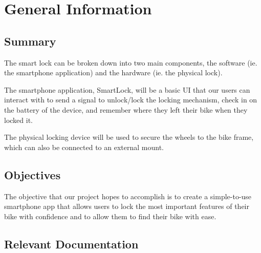 \documentclass[12pt, titlepage]{article}
\begin{document}
\section{General Information}

\subsection{Summary}

The smart lock can be broken down into two main components, the software (ie. the smartphone application) and the hardware (ie. the physical lock).

The smartphone application, SmartLock, will be a basic UI that our users can interact with to send a signal to unlock/lock the locking mechanism, check in on the battery of the device, and remember where they left their bike when they locked it.

The physical locking device will be used to secure the wheels to the bike frame, which can also be connected to an external mount.



\subsection{Objectives}

The objective that our project hopes to accomplish is to create a simple-to-use smartphone app that allows users to lock the most important features of their bike with confidence and to allow them to find their bike with ease.


\subsection{Relevant Documentation}

\end{document}
